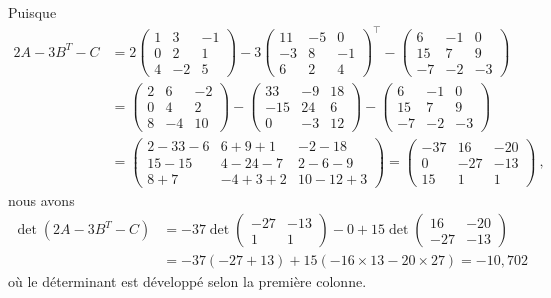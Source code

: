 { Puisque
\begin{align*}
2A-3B^T-C &= 2\begin{pmatrix}
1 & 3 & -1 \\
0 & 2 & 1 \\
4 & -2 & 5
\end{pmatrix}
-3\begin{pmatrix}
11 & -5 & 0 \\
-3 & 8 & -1 \\
6 & 2& 4
\end{pmatrix}^\top
-\begin{pmatrix}
6 & -1 & 0 \\
15 & 7 & 9 \\
-7 & -2 & -3
\end{pmatrix} \\
&= \begin{pmatrix}
2 & 6 & -2 \\
0 & 4 & 2 \\
8 & -4 & 10
\end{pmatrix}
-\begin{pmatrix}
33 & -9 & 18 \\
-15 & 24 & 6 \\
0 & -3 & 12
\end{pmatrix}
-\begin{pmatrix}
6 & -1 & 0 \\
15 & 7 & 9 \\
-7 & -2 & -3
\end{pmatrix} \\
&= \begin{pmatrix}
2-33-6 & 6+9+1 & -2-18 \\
15-15 & 4-24-7 & 2-6-9 \\
8+7 & -4+3+2 & 10-12+3
\end{pmatrix}
= \begin{pmatrix}
-37 & 16 & -20 \\
0 & -27 & -13 \\
15 & 1 & 1
\end{pmatrix} \ ,
\end{align*}
nous avons
\begin{align*}
\det(2A-3B^T-C) &=
-37 \det
\begin{pmatrix}
-27 & -13 \\ 1 & 1
\end{pmatrix}
-0+15\det
\begin{pmatrix}
16 & -20 \\ -27 & -13
\end{pmatrix} \\
&= -37(-27+13) + 15(-16\times 13 - 20 \times 27) = -10,702
\end{align*}
où le déterminant est développé selon la première colonne.

}
